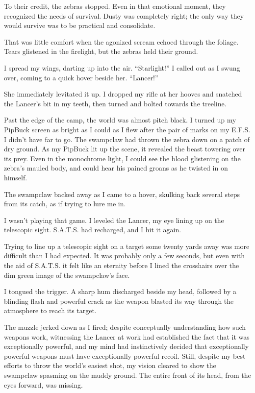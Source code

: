 To their credit, the zebras stopped. Even in that emotional moment, they recognized the needs of survival. Dusty was completely right; the only way they would survive was to be practical and consolidate.

That was little comfort when the agonized scream echoed through the foliage. Tears glistened in the firelight, but the zebras held their ground.

I spread my wings, darting up into the air. “Starlight!” I called out as I swung over, coming to a quick hover beside her. “Lancer!”

She immediately levitated it up. I dropped my rifle at her hooves and snatched the Lancer’s bit in my teeth, then turned and bolted towards the treeline.

Past the edge of the camp, the world was almost pitch black. I turned up my PipBuck screen as bright as I could as I flew after the pair of marks on my E.F.S. I didn’t have far to go. The swampclaw had thrown the zebra down on a patch of dry ground. As my PipBuck lit up the scene, it revealed the beast towering over its prey. Even in the monochrome light, I could see the blood glistening on the zebra’s mauled body, and could hear his pained groans as he twisted in on himself.

The swampclaw backed away as I came to a hover, skulking back several steps from its catch, as if trying to lure me in.

I wasn’t playing that game. I leveled the Lancer, my eye lining up on the telescopic sight. S.A.T.S. had recharged, and I hit it again.

Trying to line up a telescopic sight on a target some twenty yards away was more difficult than I had expected. It was probably only a few seconds, but even with the aid of S.A.T.S. it felt like an eternity before I lined the crosshairs over the dim green image of the swampclaw’s face.

I tongued the trigger. A sharp hum discharged beside my head, followed by a blinding flash and powerful crack as the weapon blasted its way through the atmosphere to reach its target.

The muzzle jerked down as I fired; despite conceptually understanding how such weapons work, witnessing the Lancer at work had established the fact that it was exceptionally powerful, and my mind had instinctively decided that exceptionally powerful weapons must have exceptionally powerful recoil. Still, despite my best efforts to throw the world’s easiest shot, my vision cleared to show the swampclaw spasming on the muddy ground. The entire front of its head, from the eyes forward, was missing.

